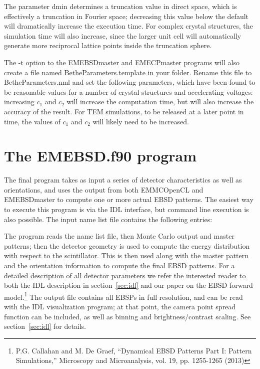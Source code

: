 \documentclass[DIV=calc, paper=letter, fontsize=11pt]{scrartcl}	 %
\begin{document}
The parameter \textsf{dmin} determines a truncation value in direct space, which is effectively a truncation in Fourier space; decreasing
this value below the default will dramatically increase the execution time.  For complex crystal structures, the simulation time will also
increase, since the larger unit cell will automatically generate more reciprocal lattice points inside the truncation sphere.


The \textsf{-t} option to the \textsf{EMEBSDmaster} and \textsf{EMECPmaster} programs will also create a file named \textsf{BetheParameters.template} in
your folder.  Rename this file to \textsf{BetheParameters.nml} and set the following parameters, which have been found to be 
reasonable values for a number of crystal structures and accelerating voltages:
increasing $c_1$ and $c_2$ will increase the computation time, but will also increase the accuracy of the result. For TEM simulations,
to be released at a later point in time, the values of $c_1$ and $c_2$ will likely need to be increased.


\section{The \protect\textsf{EMEBSD.f90} program\label{sec:f90EBSD}}
The final program takes as input a series of detector characteristics as well as orientations, and uses the output from both \textsf{EMMCOpenCL} and
\textsf{EMEBSDmaster} to compute one or more actual EBSD patterns.  
The easiest way to execute this program is via the IDL interface, but command line execution is also possible.  
The input name list file contains the following entries:

The program reads the name list file, then Monte Carlo output and master patterns;  then the detector geometry is used to
compute the energy distribution with respect to the scintillator.  This is then used along with the master pattern and the 
orientation information to compute the final EBSD patterns.  For a detailed description of all detector parameters we 
refer the interested reader to both the IDL description in section~\ref{sec:idl} and our paper on the EBSD forward model.\footnote{P.G. Callahan and M. De Graef, 
``Dynamical EBSD Patterns Part I: Pattern Simulations,'' Microscopy and Microanalysis, vol. 19, pp. 1255-1265 (2013)}
The output file contains all EBSPs in full resolution,
and can be read with the IDL visualization program; at that point, the camera point spread function can be included, as well
as binning and brightness/contrast scaling. See section~\ref{sec:idl} for details.
\end{document}
